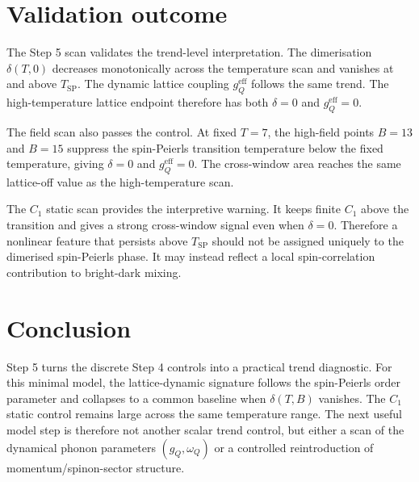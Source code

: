 \documentclass[11pt]{article}
\begin{document}
\section{Validation outcome}
The Step 5 scan validates the trend-level interpretation.  The dimerisation
$\delta(T,0)$ decreases monotonically across the temperature scan and vanishes
at and above $T_{\mathrm{SP}}$.  The dynamic lattice coupling
$g_Q^{\mathrm{eff}}$ follows the same trend.  The high-temperature lattice
endpoint therefore has both $\delta=0$ and $g_Q^{\mathrm{eff}}=0$.

The field scan also passes the control.  At fixed $T=7$, the high-field points
$B=13$ and $B=15$ suppress the spin-Peierls transition temperature below the
fixed temperature, giving $\delta=0$ and $g_Q^{\mathrm{eff}}=0$.  The
cross-window area reaches the same lattice-off value as the high-temperature
scan.

The $C_1$ static scan provides the interpretive warning.  It keeps finite
$C_1$ above the transition and gives a strong cross-window signal even when
$\delta=0$.  Therefore a nonlinear feature that persists above
$T_{\mathrm{SP}}$ should not be assigned uniquely to the dimerised
spin-Peierls phase.  It may instead reflect a local spin-correlation
contribution to bright-dark mixing.

\section{Conclusion}
Step 5 turns the discrete Step 4 controls into a practical trend diagnostic.
For this minimal model, the lattice-dynamic signature follows the
spin-Peierls order parameter and collapses to a common baseline when
$\delta(T,B)$ vanishes.  The $C_1$ static control remains large across the same
temperature range.  The next useful model step is therefore not another scalar
trend control, but either a scan of the dynamical phonon parameters
$(g_Q,\omega_Q)$ or a controlled reintroduction of momentum/spinon-sector
structure.
\end{document}
